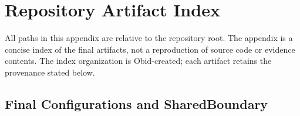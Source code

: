 \section{Repository Artifact Index}\label{app:artifact-index}

All paths in this appendix are relative to the repository root. The appendix is
a concise index of the final artifacts, not a reproduction of source code or
evidence contents. The index organization is Obid-created; each artifact
retains the provenance stated below.

\subsection[Final Configurations and Shared Boundary]{Final Configurations and
Shared\texorpdfstring{\newline}{ }Boundary}\label{app:configurations-boundary}

